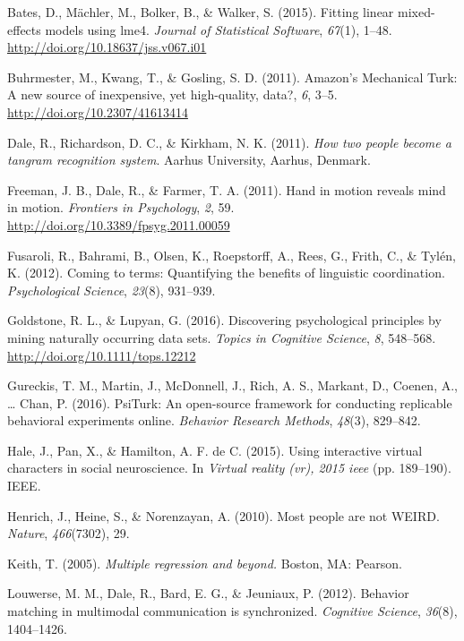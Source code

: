 \documentclass[10pt, letterpaper]{article}
\begin{document}
\hypertarget{ref-bates2015fitting}{}
Bates, D., Mächler, M., Bolker, B., \& Walker, S. (2015). Fitting linear
mixed-effects models using lme4. \emph{Journal of Statistical Software},
\emph{67}(1), 1--48. \url{http://doi.org/10.18637/jss.v067.i01}

\hypertarget{ref-buhrmester2011amazon}{}
Buhrmester, M., Kwang, T., \& Gosling, S. D. (2011). Amazon's Mechanical
Turk: A new source of inexpensive, yet high-quality, data?, \emph{6},
3--5. \url{http://doi.org/10.2307/41613414}

\hypertarget{ref-dale2011how}{}
Dale, R., Richardson, D. C., \& Kirkham, N. K. (2011). \emph{How two
people become a tangram recognition system}. Aarhus University, Aarhus,
Denmark.

\hypertarget{ref-freeman2011hand}{}
Freeman, J. B., Dale, R., \& Farmer, T. A. (2011). Hand in motion
reveals mind in motion. \emph{Frontiers in Psychology}, \emph{2}, 59.
\url{http://doi.org/10.3389/fpsyg.2011.00059}

\hypertarget{ref-fusaroli2012coming}{}
Fusaroli, R., Bahrami, B., Olsen, K., Roepstorff, A., Rees, G., Frith,
C., \& Tylén, K. (2012). Coming to terms: Quantifying the benefits of
linguistic coordination. \emph{Psychological Science}, \emph{23}(8),
931--939.

\hypertarget{ref-goldstone2016discovering}{}
Goldstone, R. L., \& Lupyan, G. (2016). Discovering psychological
principles by mining naturally occurring data sets. \emph{Topics in
Cognitive Science}, \emph{8}, 548--568.
\url{http://doi.org/10.1111/tops.12212}

\hypertarget{ref-gureckis2016psiturk}{}
Gureckis, T. M., Martin, J., McDonnell, J., Rich, A. S., Markant, D.,
Coenen, A., \ldots{} Chan, P. (2016). PsiTurk: An open-source framework
for conducting replicable behavioral experiments online. \emph{Behavior
Research Methods}, \emph{48}(3), 829--842.

\hypertarget{ref-hale2015using}{}
Hale, J., Pan, X., \& Hamilton, A. F. de C. (2015). Using interactive
virtual characters in social neuroscience. In \emph{Virtual reality
(vr), 2015 ieee} (pp. 189--190). IEEE.

\hypertarget{ref-henrich2010most}{}
Henrich, J., Heine, S., \& Norenzayan, A. (2010). Most people are not
WEIRD. \emph{Nature}, \emph{466}(7302), 29.

\hypertarget{ref-keith2005multiple}{}
Keith, T. (2005). \emph{Multiple regression and beyond.} Boston, MA:
Pearson.

\hypertarget{ref-louwerse2012behavior}{}
Louwerse, M. M., Dale, R., Bard, E. G., \& Jeuniaux, P. (2012). Behavior
matching in multimodal communication is synchronized. \emph{Cognitive
Science}, \emph{36}(8), 1404--1426.
\end{document}

